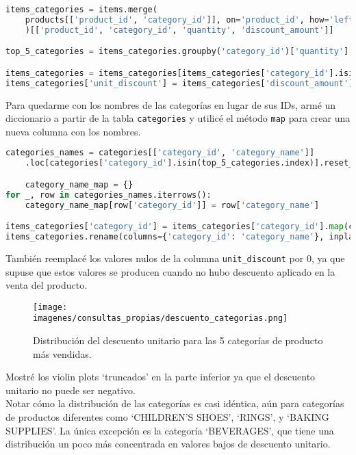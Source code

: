 \begin{lstlisting}[language=Python, xleftmargin=19pt, xrightmargin=19pt]
items_categories = items.merge(
    products[['product_id', 'category_id']], on='product_id', how='left'
    )[['product_id', 'category_id', 'quantity', 'discount_amount']]

top_5_categories = items_categories.groupby('category_id')['quantity'].sum().nlargest(5)

items_categories = items_categories[items_categories['category_id'].isin(top_5_categories.index)]
items_categories['unit_discount'] = items_categories['discount_amount'] / items_categories['quantity']
\end{lstlisting}

Para quedarme con los nombres de las categorías en lugar de sus IDs, armé un diccionario a partir de la tabla \texttt{categories} y utilicé el método \texttt{map} para crear una nueva columna con los nombres.

\begin{lstlisting}[language=Python, xleftmargin=35pt, xrightmargin=35pt]
categories_names = categories[['category_id', 'category_name']]
    .loc[categories['category_id'].isin(top_5_categories.index)].reset_index()

    category_name_map = {}
for _, row in categories_names.iterrows():
    category_name_map[row['category_id']] = row['category_name']

items_categories['category_id'] = items_categories['category_id'].map(category_name_map)
items_categories.rename(columns={'category_id': 'category_name'}, inplace=True)
\end{lstlisting}

También reemplacé los valores nulos de la columna \texttt{unit\_discount} por 0, ya que supuse que estos valores se producen cuando no hubo descuento aplicado en la venta del producto.

\begin{figure}[H]
    \centering
    \texttt{[image: imagenes/consultas\_propias/descuento\_categorias.png]}
    \caption{Distribución del descuento unitario para las 5 categorías de producto más vendidas.}
    \label{fig:descuento_categorias}
\end{figure}

Mostré los violin plots `truncados' en la parte inferior ya que el descuento unitario no puede ser negativo. \\
Notar cómo la distribución de las categorías es casi idéntica, aún para categorías de productos diferentes como `CHILDREN'S SHOES', `RINGS', y `BAKING SUPPLIES'. La única excepción es la categoría `BEVERAGES', que tiene una distribución un poco más concentrada en valores bajos de descuento unitario.

